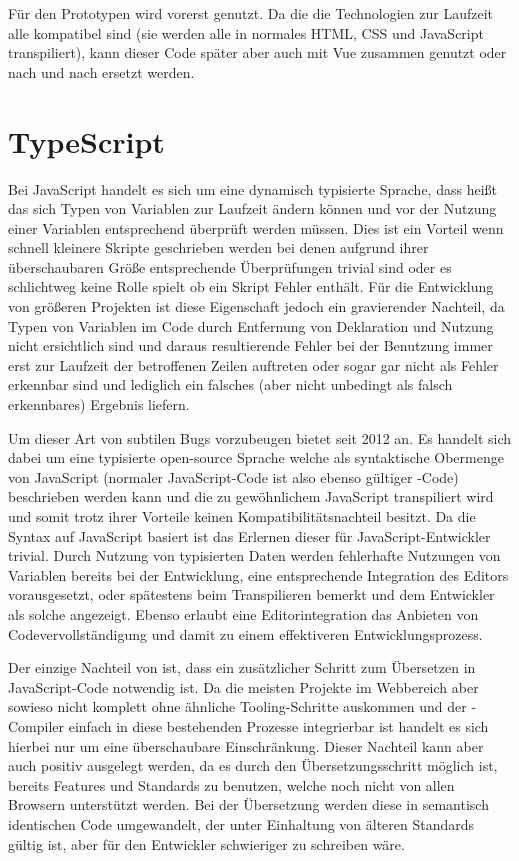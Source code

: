 Für den Prototypen wird vorerst  genutzt. Da die die Technologien zur Laufzeit alle kompatibel sind (sie werden alle in normales HTML, CSS und JavaScript transpiliert), kann dieser Code später aber auch mit Vue zusammen genutzt oder nach und nach ersetzt werden.

\section{TypeScript}
Bei JavaScript handelt es sich um eine dynamisch typisierte Sprache, dass heißt das sich Typen von Variablen zur Laufzeit ändern können und vor der Nutzung einer Variablen entsprechend überprüft werden müssen. Dies ist ein Vorteil wenn schnell kleinere Skripte geschrieben werden bei denen aufgrund ihrer überschaubaren Größe entsprechende Überprüfungen trivial sind oder es schlichtweg keine Rolle spielt ob ein Skript Fehler enthält. Für die Entwicklung von größeren Projekten ist diese Eigenschaft jedoch ein gravierender Nachteil, da Typen von Variablen im Code durch Entfernung von Deklaration und Nutzung nicht ersichtlich sind und daraus resultierende Fehler bei der Benutzung immer erst zur Laufzeit der betroffenen Zeilen auftreten oder sogar gar nicht als Fehler erkennbar sind und lediglich ein falsches (aber nicht unbedingt als falsch erkennbares) Ergebnis liefern.   

Um dieser Art von subtilen Bugs vorzubeugen bietet  seit 2012  an. Es handelt sich dabei um eine typisierte open-source Sprache welche als syntaktische Obermenge von JavaScript (normaler JavaScript-Code ist also ebenso gültiger -Code) beschrieben werden kann und die zu gewöhnlichem JavaScript transpiliert wird und somit trotz ihrer Vorteile keinen Kompatibilitätsnachteil besitzt. Da die Syntax auf JavaScript basiert ist das Erlernen dieser für JavaScript-Entwickler trivial. Durch Nutzung von typisierten Daten werden fehlerhafte Nutzungen von Variablen bereits bei der Entwicklung, eine entsprechende Integration des Editors vorausgesetzt, oder spätestens beim Transpilieren bemerkt und dem Entwickler als solche angezeigt. Ebenso erlaubt eine Editorintegration das Anbieten von Codevervollständigung und damit zu einem effektiveren Entwicklungsprozess.

Der einzige Nachteil von  ist, dass ein zusätzlicher Schritt zum Übersetzen in JavaScript-Code notwendig ist. Da die meisten Projekte im Webbereich aber sowieso nicht komplett ohne ähnliche Tooling-Schritte auskommen und der -Compiler einfach in diese bestehenden Prozesse integrierbar ist handelt es sich hierbei nur um eine überschaubare Einschränkung. Dieser Nachteil kann aber auch positiv ausgelegt werden, da es durch den Übersetzungsschritt möglich ist, bereits Features und Standards zu benutzen, welche noch nicht von allen Browsern unterstützt werden. Bei der Übersetzung werden diese in semantisch identischen Code umgewandelt, der unter Einhaltung von älteren Standards gültig ist, aber für den Entwickler schwieriger zu schreiben wäre. 

